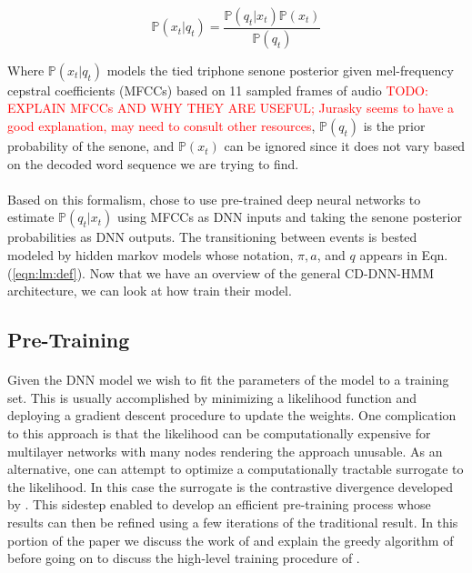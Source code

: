 \documentclass[letterpaper]{article}
\newcommand{\TODO}[1]{\textcolor{red}{TODO: #1}}
\newcommand{\cprob}[2]{ \prob{#1 \lvert #2} }
\newcommand{\prob}[1]{\mathbb{P}\left( #1 \right)}
\begin{document}
\begin{equation*}
	\cprob{x_t}{q_t} = \frac{\cprob{q_t}{x_t} \prob{x_t}}{\prob{q_t}}
	\label{eqn:senone:def}	
\end{equation*}

Where $\cprob{x_t}{q_t}$ models the tied triphone senone posterior given mel-frequency cepstral coefficients (MFCCs) based on 11 sampled frames of audio \TODO{EXPLAIN MFCCs AND WHY THEY ARE USEFUL; Jurasky seems to have a good explanation, may need to consult other resources}, $\prob{q_t}$ is the prior probability of the senone, and $\prob{x_t}$ can be ignored since it does not vary based on the decoded word sequence we are trying to find.

\paragraph{} Based on this formalism, \cite{DBLP:journals/taslp/DahlYDA12} chose to use pre-trained deep neural networks to estimate $\cprob{q_t}{x_t}$ using MFCCs as DNN inputs and taking the senone posterior probabilities as DNN outputs. The transitioning between events is bested modeled by hidden markov models whose notation, $\pi, a$, and $q$ appears in Eqn. (\ref{eqn:lm:def}). Now that we have an overview of the general CD-DNN-HMM architecture, we can look at how \cite{DBLP:journals/taslp/DahlYDA12} train their model.

\subsection*{Pre-Training}

\paragraph{} Given the DNN model we wish to fit the parameters of the model to a training set. This is usually accomplished by minimizing a likelihood function and deploying a gradient descent procedure to update the weights. One complication to this approach is that the likelihood can be computationally expensive for multilayer networks with many nodes rendering the approach unusable. As an alternative, one can attempt to optimize a computationally tractable surrogate to the likelihood. In this case the surrogate is the contrastive divergence developed by \cite{DBLP:journals/neco/Hinton02}. This sidestep enabled \cite{DBLP:journals/neco/HintonOT06} to develop an efficient pre-training process whose results can then be refined using a few iterations of the traditional result. In this portion of the paper we discuss the work of \cite{DBLP:journals/neco/Hinton02} and explain the greedy algorithm of \cite{DBLP:journals/neco/HintonOT06} before going on to discuss the high-level training procedure of \cite{DBLP:journals/taslp/DahlYDA12}.
\end{document}
